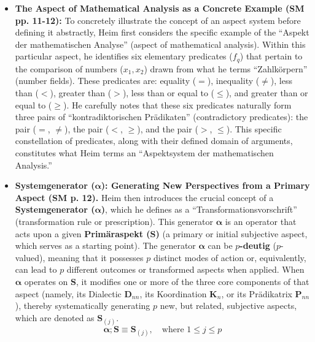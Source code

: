 \documentclass[12pt]{article}
\newcommand{\q}[1]{\enquote{#1}}
\begin{document}
\begin{itemize}
    \item \textbf{The Aspect of Mathematical Analysis as a Concrete Example (SM pp. 11-12):}
    To concretely illustrate the concept of an aspect system before defining it abstractly, Heim first considers the specific example of the \q{Aspekt der mathematischen Analyse} (aspect of mathematical analysis). Within this particular aspect, he identifies six elementary predicates (\(f_q\)) that pertain to the comparison of numbers (\(x_1, x_2\)) drawn from what he terms \q{Zahlkörpern} (number fields). These predicates are: equality (\(=\)), inequality (\(\neq\)), less than (\(<\)), greater than (\(>\)), less than or equal to (\(\leq\)), and greater than or equal to (\(\geq\)). He carefully notes that these six predicates naturally form three pairs of \q{kontradiktorischen Prädikaten} (contradictory predicates): the pair (\(=\), \(\neq\)), the pair (\(<\), \(\geq\)), and the pair (\(>\), \(\leq\)). This specific constellation of predicates, along with their defined domain of arguments, constitutes what Heim terms an \q{Aspektsystem der mathematischen Analysis.} 

    \item \textbf{Systemgenerator (\(\bm{\alpha}\)): Generating New Perspectives from a Primary Aspect (SM p. 12).}
    Heim then introduces the crucial concept of a \textbf{Systemgenerator (\(\bm{\alpha}\))}, which he defines as a \q{Transformationsvorschrift} (transformation rule or prescription). This generator \( \bm{\alpha} \) is an operator that acts upon a given \textbf{Primäraspekt (\(\mathbf{S}\))} (a primary or initial subjective aspect, which serves as a starting point). The generator \( \bm{\alpha} \) can be \textbf{\(p\)-deutig} (\(p\)-valued), meaning that it possesses \( p \) distinct modes of action or, equivalently, can lead to \( p \) different outcomes or transformed aspects when applied. When \( \bm{\alpha} \) operates on \( \mathbf{S} \), it modifies one or more of the three core components of that aspect (namely, its Dialectic \( \mathbf{D}_{nn} \), its Koordination \( \mathbf{K}_n \), or its Prädikatrix \( \mathbf{P}_{nn} \)), thereby systematically generating \( p \) new, but related, subjective aspects, which are denoted as \( \mathbf{S}_{(j)} \).
    \begin{equation*}
    \bm{\alpha};\mathbf{S} \equiv \mathbf{S}_{(j)}, \quad \text{where } 1 \leq j \leq p
    \end{equation*}


\end{itemize}
\end{document}
